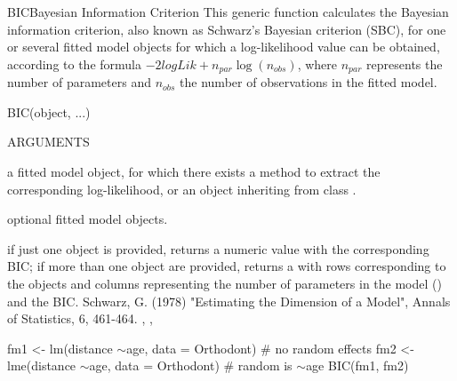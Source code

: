\documentclass[pdftex]{article} \usepackage{url,graphicx}
\renewcommand{\Twiddle}{\mbox{\(\sim\)}}
\begin{document}
\begin{Helpfile}{BIC}{Bayesian Information Criterion}
  This generic function calculates the Bayesian information criterion,
  also known as Schwarz's Bayesian criterion (SBC), for one or several
  fitted model objects for which a log-likelihood value can be
  obtained, according to the formula $-2logLik + n_{par}\log(n_{obs})$,
  where $n_{par}$ represents the number of parameters and $n_{obs}$
  the number of observations in the fitted model.
\begin{Example}
BIC(object, ...)
\end{Example}
\begin{Argument}{ARGUMENTS}
\item[\Co{object:}]
a fitted model object, for which there exists a
 method to extract the corresponding log-likelihood, or
an object inheriting from class .
\item[\Co{...:}]
optional fitted model objects.
\end{Argument}
if just one object is provided, returns a numeric value with the
corresponding BIC; if more than one object are provided, returns a
 with rows corresponding to the objects and columns
representing the number of parameters in the model () and the
BIC.
Schwarz, G. (1978) "Estimating the Dimension of a Model", Annals of
Statistics, 6, 461-464.
, , 
\need 15pt
\vspace{-16pt} 
\begin{Example}
fm1 <- lm(distance \Twiddle age, data = Orthodont) # no random effects
fm2 <- lme(distance \Twiddle age, data = Orthodont) # random is \Twiddle age
BIC(fm1, fm2)
\end{Example}
\end{Helpfile}
\end{document}
